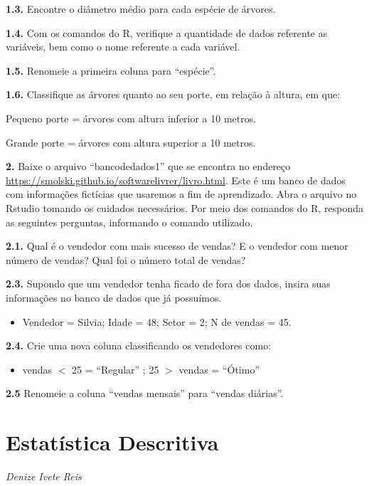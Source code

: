 \documentclass[12pt,brazil,oneside]{book}
\providecommand{\tightlist}{%
  \setlength{\itemsep}{0pt}\setlength{\parskip}{0pt}}
\begin{document}
\textbf{1.3.} Encontre o diâmetro médio para cada espécie de árvores.

\textbf{1.4.} Com os comandos do R, verifique a quantidade de dados referente as variáveis, bem como o nome referente a cada variável.

\textbf{1.5.} Renomeie a primeira coluna para ``espécie''.

\textbf{1.6.} Classifique as árvores quanto ao seu porte, em relação à altura, em que:

Pequeno porte = árvores com altura inferior a 10 metros.

Grande porte = árvores com altura superior a 10 metros.

\textbf{2.} Baixe o arquivo ``bancodedados1'' que se encontra no endereço \url{https://smolski.github.io/softwarelivrer/livro.html}. Este é um banco de dados com informações fictícias que usaremos a fim de aprendizado. Abra o arquivo no Rstudio tomando os cuidados necessários. Por meio dos comandos do R, responda as seguintes perguntas, informando o comando utilizado.

\textbf{2.1.} Qual é o vendedor com mais sucesso de vendas? E o vendedor com menor número de vendas?
Qual foi o número total de vendas?

\textbf{2.3.} Supondo que um vendedor tenha ficado de fora dos dados, insira suas informações no banco de dados que já possuímos.

\begin{itemize}
\tightlist
\item
  Vendedor = Silvia; Idade = 48; Setor = 2; N de vendas = 45.
\end{itemize}

\textbf{2.4.} Crie uma nova coluna classificando os vendedores como:

\begin{itemize}
\tightlist
\item
  vendas \(<\) 25 = ``Regular'' ; 25 \(>\) vendas = ``Ótimo''
\end{itemize}

\textbf{2.5} Renomeie a coluna ``vendas mensais'' para ``vendas diárias''.

\hypertarget{desc}{%
\chapter{Estatística Descritiva}\label{desc}}

\emph{Denize Ivete Reis}

\begin{flushright}
\emph{}
\end{flushright}
\end{document}
